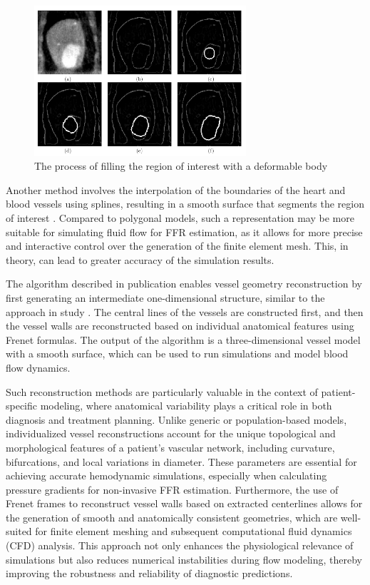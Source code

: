\documentclass[default]{subfiles}
\begin{document}
\begin{figure}[H]
    \centering
    \includegraphics[width=0.7\textwidth]{image/pic1.png}
    \caption{The process of filling the region of interest with a deformable body \cite{mcinerney1995fem}}
\end{figure}

Another method involves the interpolation of the boundaries of the heart and blood vessels using splines, resulting in
a smooth surface that segments the region of interest \cite{ecabert2008automatic}. Compared to polygonal models, such a
representation may be more suitable for simulating fluid flow for FFR estimation, as it allows for more precise and
interactive control over the generation of the finite element mesh. This, in theory, can lead to greater accuracy of
the simulation results.

The algorithm described in publication \cite{lu2020vessels} enables vessel geometry reconstruction by first generating
an intermediate one-dimensional structure, similar to the approach in study \cite{carson2019benchmark}. The central
lines of the vessels are constructed first, and then the vessel walls are reconstructed based on individual anatomical
features using Frenet formulas. The output of the algorithm is a three-dimensional vessel model with a smooth surface,
which can be used to run simulations and model blood flow dynamics.

Such reconstruction methods are particularly valuable in the context of patient-specific modeling, where anatomical
variability plays a critical role in both diagnosis and treatment planning. Unlike generic or population-based models,
individualized vessel reconstructions account for the unique topological and morphological features of a patient's
vascular network, including curvature, bifurcations, and local variations in diameter. These parameters are essential
for achieving accurate hemodynamic simulations, especially when calculating pressure gradients for non-invasive FFR
estimation. Furthermore, the use of Frenet frames to reconstruct vessel walls based on extracted centerlines allows for
the generation of smooth and anatomically consistent geometries, which are well-suited for finite element meshing and
subsequent computational fluid dynamics (CFD) analysis. This approach not only enhances the physiological relevance of
simulations but also reduces numerical instabilities during flow modeling, thereby improving the robustness and
reliability of diagnostic predictions.
\end{document}
